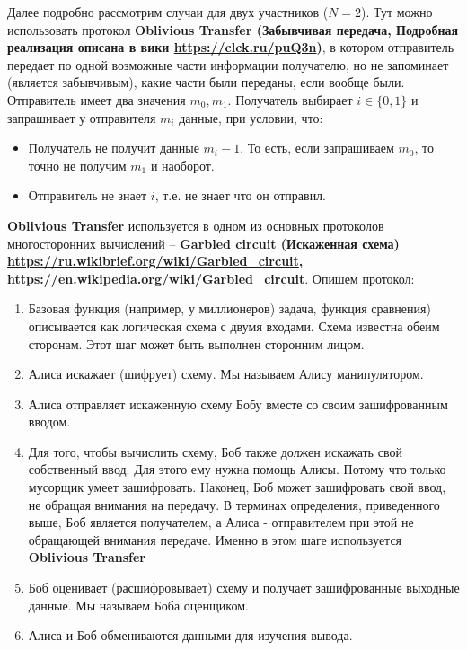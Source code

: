 Далее подробно рассмотрим случаи для двух участников ($N=2$).
Тут можно использовать протокол \textbf{Oblivious Transfer (Забывчивая передача, Подробная реализация описана в вики \url{https://clck.ru/puQ3n})}, в котором отправитель передает по одной возможные части информации получателю, но не запоминает (является забывчивым), какие части были переданы, если вообще были. Отправитель имеет два значения $m_0, m_1$. Получатель выбирает $i \in \{0,1 \}$ и запрашивает у отправителя $m_i$ данные, при условии, что:
\begin{itemize}
	\item Получатель не получит данные $m_i-1$. То есть, если запрашиваем $m_0$, то точно не получим $m_1$ и наоборот.
	\item Отправитель не знает $i$, т.е. не знает что он отправил. 
\end{itemize}

\textbf{Oblivious Transfer} используется в одном из основных протоколов многосторонних вычислений -- \textbf{Garbled circuit
 (Искаженная схема) \url{https://ru.wikibrief.org/wiki/Garbled_circuit}, \url{https://en.wikipedia.org/wiki/Garbled_circuit}}. Опишем протокол:
\begin{enumerate}
	\item Базовая функция (например, у миллионеров) задача, функция сравнения) описывается как логическая схема с двумя входами. Схема известна обеим сторонам. Этот шаг может быть выполнен сторонним лицом.
	\item Алиса искажает (шифрует) схему. Мы называем Алису манипулятором.
	\item Алиса отправляет искаженную схему Бобу вместе со своим зашифрованным вводом.
	\item Для того, чтобы вычислить схему, Боб также должен искажать свой собственный ввод. Для этого ему нужна помощь Алисы. Потому что только мусорщик умеет зашифровать. Наконец, Боб может зашифровать свой ввод, не обращая внимания на передачу. В терминах определения, приведенного выше, Боб является получателем, а Алиса - отправителем при этой не обращающей внимания передаче. Именно в этом шаге используется \textbf{Oblivious Transfer}
	\item Боб оценивает (расшифровывает) схему и получает зашифрованные выходные данные. Мы называем Боба оценщиком.
	\item Алиса и Боб обмениваются данными для изучения вывода.
\end{enumerate}

